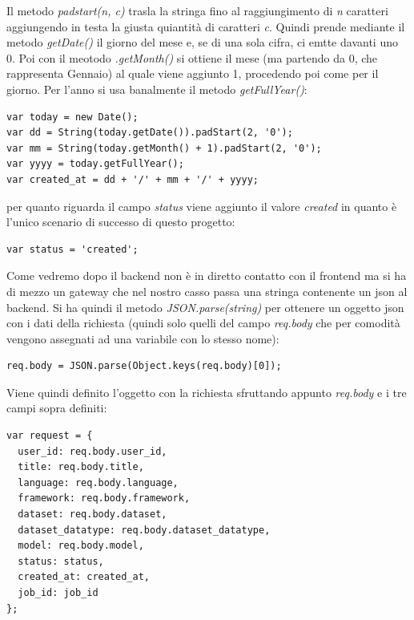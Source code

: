 \documentclass[a4paper,12pt, oneside]{book}
\begin{document}
Il metodo \textit{padstart(n, c)} trasla la stringa fino al raggiungimento di \textit{n}
caratteri aggiungendo in testa la giusta quiantità di caratteri \textit{c}. Quindi prende
mediante il metodo \textit{getDate()} il giorno del mese e, se di una sola cifra,
ci emtte davanti uno 0. Poi con il meotodo \textit{.getMonth()} si ottiene il mese
(ma partendo da 0, che rappresenta Gennaio) al quale viene aggiunto 1, procedendo
poi come per il giorno. Per l'anno si usa banalmente il metodo \textit{getFullYear()}:
\begin{shaded} 
\begin{verbatim}
var today = new Date();
var dd = String(today.getDate()).padStart(2, '0');
var mm = String(today.getMonth() + 1).padStart(2, '0');
var yyyy = today.getFullYear();
var created_at = dd + '/' + mm + '/' + yyyy;
\end{verbatim}
\end{shaded}
per quanto riguarda il campo \textit{status} viene aggiunto il valore \textit{created} in quanto è l'unico scenario di successo di questo progetto:
\begin{shaded} 
\begin{verbatim}
var status = 'created';
\end{verbatim}
\end{shaded}
Come vedremo dopo il backend non è in diretto contatto con il frontend
ma si ha di mezzo un gateway che nel nostro casso passa una stringa contenente un json al backend.
Si ha quindi il metodo \textit{JSON.parse(string)} per ottenere un oggetto json con i dati della richiesta (quindi solo quelli del campo \textit{req.body} che per comodità vengono assegnati ad una variabile con lo stesso nome):
\begin{shaded} 
\begin{verbatim}
req.body = JSON.parse(Object.keys(req.body)[0]);  
\end{verbatim}
\end{shaded}
Viene quindi definito l'oggetto con la richiesta sfruttando appunto \textit{req.body} e i tre campi sopra definiti:
\begin{shaded} 
\begin{verbatim}
var request = {
  user_id: req.body.user_id,
  title: req.body.title,
  language: req.body.language,
  framework: req.body.framework,
  dataset: req.body.dataset,
  dataset_datatype: req.body.dataset_datatype,
  model: req.body.model,  
  status: status,
  created_at: created_at,
  job_id: job_id
};
\end{verbatim}
\end{shaded}
\end{document}

